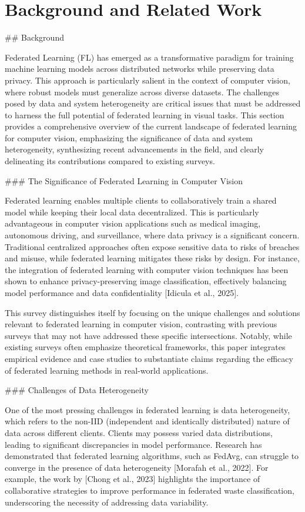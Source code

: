 \documentclass[journal]{IEEEtran}
\begin{document}
\section{Background and Related Work}
\label{sec:background}

\#\# Background

Federated Learning (FL) has emerged as a transformative paradigm for training machine learning models across distributed networks while preserving data privacy. This approach is particularly salient in the context of computer vision, where robust models must generalize across diverse datasets. The challenges posed by data and system heterogeneity are critical issues that must be addressed to harness the full potential of federated learning in visual tasks. This section provides a comprehensive overview of the current landscape of federated learning for computer vision, emphasizing the significance of data and system heterogeneity, synthesizing recent advancements in the field, and clearly delineating its contributions compared to existing surveys.

\#\#\# The Significance of Federated Learning in Computer Vision

Federated learning enables multiple clients to collaboratively train a shared model while keeping their local data decentralized. This is particularly advantageous in computer vision applications such as medical imaging, autonomous driving, and surveillance, where data privacy is a significant concern. Traditional centralized approaches often expose sensitive data to risks of breaches and misuse, while federated learning mitigates these risks by design. For instance, the integration of federated learning with computer vision techniques has been shown to enhance privacy-preserving image classification, effectively balancing model performance and data confidentiality [Idicula et al., 2025]. 

This survey distinguishes itself by focusing on the unique challenges and solutions relevant to federated learning in computer vision, contrasting with previous surveys that may not have addressed these specific intersections. Notably, while existing surveys often emphasize theoretical frameworks, this paper integrates empirical evidence and case studies to substantiate claims regarding the efficacy of federated learning methods in real-world applications.

\#\#\# Challenges of Data Heterogeneity

One of the most pressing challenges in federated learning is data heterogeneity, which refers to the non-IID (independent and identically distributed) nature of data across different clients. Clients may possess varied data distributions, leading to significant discrepancies in model performance. Research has demonstrated that federated learning algorithms, such as FedAvg, can struggle to converge in the presence of data heterogeneity [Morafah et al., 2022]. For example, the work by [Chong et al., 2023] highlights the importance of collaborative strategies to improve performance in federated waste classification, underscoring the necessity of addressing data variability.
\end{document}
